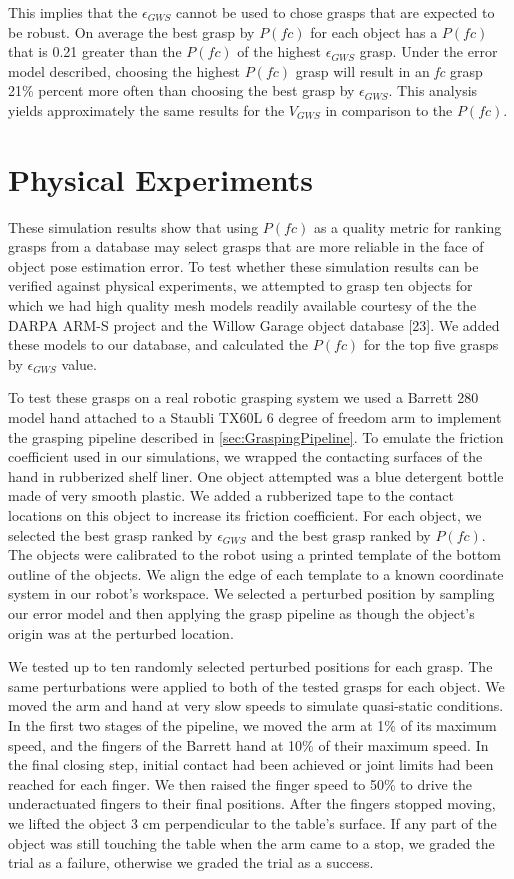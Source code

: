  This implies that the $\epsilon_{GWS}$ cannot be used to chose grasps that are expected to be robust. On average the best grasp by $P(fc)$ for each object has a $P(fc)$ that is 0.21 greater than the $P(fc)$ of the highest $\epsilon_{GWS}$ grasp. Under the error model described, choosing the highest $P(fc)$ grasp will result in an \emph{fc} grasp 21\% percent more often than choosing the best grasp by $\epsilon_{GWS}$. This analysis yields approximately the same results for the $V_{GWS}$ in comparison to the $P(fc)$.\par

\section{Physical Experiments}
These simulation results show that using $P(fc)$ as a quality metric for ranking grasps from a database may select grasps that are more reliable in the face of object pose estimation error. To test whether these simulation results can be verified against physical experiments, we attempted to grasp ten objects for which we had high quality mesh models readily available courtesy of the the DARPA ARM-S project and the Willow Garage object database [23]. We added these models to our database, and calculated the $P(fc)$ for the top five grasps by $\epsilon_{GWS}$ value.

 To test these grasps on a real robotic grasping system we used a Barrett 280 model hand attached to a Staubli TX60L 6 degree of freedom arm to implement the grasping pipeline described in \ref{sec:GraspingPipeline}. To emulate the friction coefficient used in our simulations, we wrapped the contacting surfaces of the hand in rubberized shelf liner. One object attempted was a blue detergent bottle made of very smooth plastic. We added a rubberized tape to the contact locations on this object to increase its friction coefficient. For each object, we selected the best grasp ranked by $\epsilon_{GWS}$ and the best grasp ranked by $P(fc)$. The objects were calibrated to the robot using a printed template of the bottom outline of the objects. We align the edge of each template to a known coordinate system in our robot’s workspace. We selected a perturbed position by sampling our error model and then applying the grasp pipeline as though the object’s origin was at the perturbed location. 

We tested up to ten randomly selected perturbed positions for each grasp. The same perturbations were applied to both of the tested grasps for each object. We moved the arm and hand at very slow speeds to simulate quasi-static conditions. In the first two stages of the pipeline, we moved the arm at 1\% of its maximum speed, and the fingers of the Barrett hand at 10\% of their maximum speed. In the final closing step, initial contact had been achieved or joint limits had been reached for each finger. We then raised the finger speed to 50\% to drive the underactuated fingers to their final positions. After the fingers stopped moving, we lifted the object 3 cm perpendicular to the table’s surface. If any part of the object was still touching the table when the arm came to a stop, we graded the trial as a failure, otherwise we graded the trial as a success. 

